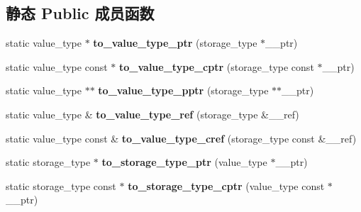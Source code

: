 \subsection*{静态 Public 成员函数}
\begin{DoxyCompactItemize}
\item 
\mbox{\label{struct___cast_traits_a4b10a72f209f56059e56e25b4b679617}} 
static value\+\_\+type $\ast$ {\bfseries to\+\_\+value\+\_\+type\+\_\+ptr} (storage\+\_\+type $\ast$\+\_\+\+\_\+ptr)
\item 
\mbox{\label{struct___cast_traits_a7252d8cfafc25b5e31010234974fd15d}} 
static value\+\_\+type const  $\ast$ {\bfseries to\+\_\+value\+\_\+type\+\_\+cptr} (storage\+\_\+type const $\ast$\+\_\+\+\_\+ptr)
\item 
\mbox{\label{struct___cast_traits_a621ba8f1b1f9cb03bc9c4aff2f8f6b71}} 
static value\+\_\+type $\ast$$\ast$ {\bfseries to\+\_\+value\+\_\+type\+\_\+pptr} (storage\+\_\+type $\ast$$\ast$\+\_\+\+\_\+ptr)
\item 
\mbox{\label{struct___cast_traits_ab041924cd4a5954612b76157d6c25a27}} 
static value\+\_\+type \& {\bfseries to\+\_\+value\+\_\+type\+\_\+ref} (storage\+\_\+type \&\+\_\+\+\_\+ref)
\item 
\mbox{\label{struct___cast_traits_a07a5f5fb1290d3023486bd65bfcb2fa1}} 
static value\+\_\+type const  \& {\bfseries to\+\_\+value\+\_\+type\+\_\+cref} (storage\+\_\+type const \&\+\_\+\+\_\+ref)
\item 
\mbox{\label{struct___cast_traits_a975bcf31721fb46b549f69d3bb43c3b0}} 
static storage\+\_\+type $\ast$ {\bfseries to\+\_\+storage\+\_\+type\+\_\+ptr} (value\+\_\+type $\ast$\+\_\+\+\_\+ptr)
\item 
\mbox{\label{struct___cast_traits_a6d00ee5f2776fd1786aa8f5d1332ac40}} 
static storage\+\_\+type const  $\ast$ {\bfseries to\+\_\+storage\+\_\+type\+\_\+cptr} (value\+\_\+type const $\ast$\+\_\+\+\_\+ptr)
\item 
\mbox{\label{struct___cast_traits_ab8441db358cf0ee8d353990193357d08}} 

\end{DoxyCompactItemize}
